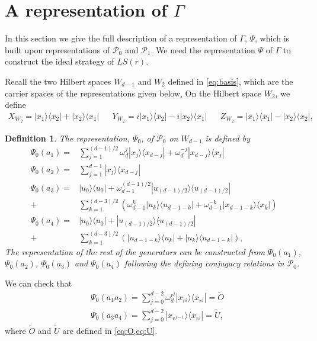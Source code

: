 \documentclass[11pt,letterpaper]{article}
\newcommand{\ketbra}[2]{|#1\rangle\langle#2|}
\newcommand{\1}{\mathbb{1}}
\newcommand{\Pg}{\mathcal{P}}
\newcommand{\LS}{LS}
\newcommand{\tO}{\tilde{O}}
\newcommand{\tU}{\tilde{U}}
\newtheorem{definition}[theorem]{Definition}
\theoremstyle{definition}
\begin{document}
\section{A representation of $\Gamma$}
\label{sec:rep_gamma}
In this section we give the full description of a representation of $\Gamma$,
$\Psi$,
which is built upon representations 
of $\Pg_0$ and $\Pg_1$. We need the representation $\Psi$ of $\Gamma$ 
to construct the ideal strategy of $\LS(r)$.

Recall the two Hilbert spaces $W_{d-1}$ and $W_2$ defined in \cref{eq:basis}, 
which are the carrier spaces
of the representations given below,
On the Hilbert space $W_2$, we define
\begin{align*}
	X_{W_2} = \ketbra{x_1}{x_2} + \ketbra{x_2}{x_1} &&
	Y_{W_2} = i\ketbra{x_1}{x_2} - i \ketbra{x_2}{x_1} &&
	Z_{W_2} = \ketbra{x_1}{x_1} - \ketbra{x_2}{x_2},
\end{align*}
\begin{definition}
\label{def:rep_g0}
The representation, $\Psi_0$, of $\Pg_0$ on $W_{d-1}$ is defined by
\begin{align*}
	\Psi_0(a_1) =&\sum_{j=1}^{(d-1)/2} \omega_d^j \ketbra{x_j}{x_{d-j}} + \omega_d^{-j} \ketbra{x_{d-j}}{x_{j}} \\
	\Psi_0(a_2) = &\sum_{j=1}^{d-1} \ketbra{x_j}{x_{d-j}}\\
	\Psi_0(a_3) = &\ketbra{u_0}{u_0} +\omega_{d-1}^{(d-1)/2}\ketbra{u_{(d-1)/2}}{u_{(d-1)/2}}\\ + 
	&\sum_{k=1}^{(d-3)/2}\left( \omega_{d-1}^k\ketbra{u_k}{u_{d-1-k}} + \omega_{d-1}^{-k}\ketbra{x_{d-1-k}}{x_k}\right)\\ 
	\Psi_0(a_4) = &\ketbra{u_0}{u_0} +\ketbra{u_{(d-1)/2}}{u_{(d-1)/2}} \\+
	 &\sum_{k=1}^{(d-3)/2}\left(\ketbra{u_{d-1-k}}{u_k} + \ketbra{u_k}{u_{d-1-k}}\right),
\end{align*}
The representation of the rest of the generators
can be constructed from $\Psi_0(a_1)$, $\Psi_0(a_2)$, $\Psi_0(a_3)$ and $\Psi_0(a_4)$ following the defining 
conjugacy relations in $\Pg_0$.
\end{definition}
We can check that
\begin{align*}
	&\Psi_0(a_1a_2) =  \sum_{j=0}^{d-2} \omega_d^{r^j} \ketbra{x_{r^j}}{x_{r^j}} =
	\tO \\
	&\Psi_0(a_3a_4) =  \sum_{j=0}^{d-2} \ketbra{x_{r^{j-1}}}{x_{r^j}} = \tU,
\end{align*}
where $\tO$ and $\tU$ are defined in \cref{eq:O,eq:U}.
\end{document}
